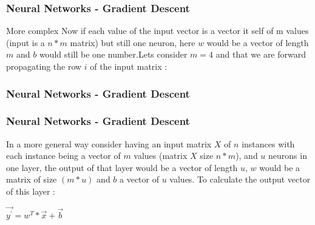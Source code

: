 \documentclass{beamer}
\begin{document}
\begin{frame}
\frametitle{Neural Networks - Gradient Descent}
\begin{block}{More complex}
Now if each value of the input vector is a vector it self of m values (input is a $ n*m $ matrix) but still one neuron, here $ w $ would be a vector of length $ m $ and $ b $ would still be one number.Lets consider $ m = 4 $ and that we are forward propagating the row $ i $ of the input matrix :\\
\end{block}
\end{frame}

\begin{frame}
\frametitle{Neural Networks - Gradient Descent}
\begin{center}
\end{center}
\end{frame}

\begin{frame}
\frametitle{Neural Networks - Gradient Descent}
\begin{block}{In a more general way}
consider having an input matrix $ X $ of $ n $ instances with each instance being a vector of $ m $ values (matrix $ X $ size $ n*m $), and $ u $ neurons in one layer, the output of that layer would be a vector of length $ u $, $ w $ would be a matrix of size $ (m*u) $ and $ b $ a vector of $ u $ values. To calculate the output vector of this layer :\\
\begin{center}
$ \vec{y^{\prime}} = w^{T}*\vec{x} + \vec{b} $
\end{center}
\end{block}
\end{frame}
\end{document}
